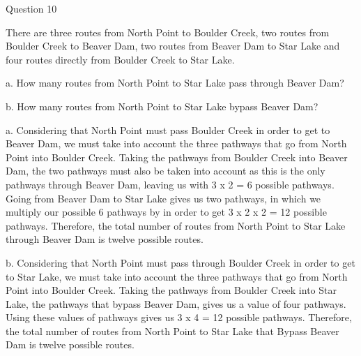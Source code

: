 \documentclass{article}
\begin{document}
\clearpage
{} Question 10
\item[] There are three routes from North Point to Boulder Creek, two routes from Boulder Creek to Beaver Dam, two routes from Beaver Dam to Star Lake and four routes directly from Boulder Creek to Star Lake. 
\item[]a. How many routes from North Point to Star Lake pass through Beaver Dam?
\item[]b. How many routes from North Point to Star Lake bypass Beaver Dam?

\item[]a. Considering that North Point must pass Boulder Creek in order to get to Beaver Dam, we must take into account the three pathways that go from North Point into Boulder Creek. Taking the pathways from Boulder Creek into Beaver Dam, the two pathways must also be taken into account as this is the only pathways through Beaver Dam, leaving us with 3 x 2 = 6 possible pathways. Going from Beaver Dam to Star Lake gives us two pathways, in which we multiply our possible 6 pathways by in order to get 3 x 2 x 2 = 12 possible pathways. Therefore, the total number of routes from North Point to Star Lake through Beaver Dam is twelve possible routes.

\item[]b. Considering that North Point must pass through Boulder Creek in order to get to Star Lake, we must take into account the three pathways that go from North Point into Boulder Creek. Taking the pathways from Boulder Creek into Star Lake, the pathways that bypass Beaver Dam, gives us a value of four pathways. Using these values of pathways gives us 3 x 4 = 12 possible pathways. Therefore, the total number of routes from North Point to Star Lake that Bypass Beaver Dam is twelve possible routes.
\end{document}
